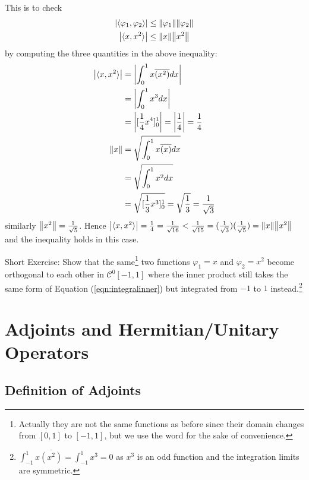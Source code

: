 \begin{solution}
This is to check 
\begin{align*}
\abs{\langle\varphi_1 , \varphi_2\rangle} &\leq \norm{\varphi_1}\norm{\varphi_2} \\
\abs{\langle x , x^2\rangle} &\leq \norm{x}\norm{x^2}
\end{align*}
by computing the three quantities in the above inequality:
\begin{align*}
\abs{\langle x , x^2\rangle} &= \abs{\int_0^1 x \overline{(x^2)} dx} \\
&= \abs{\int_0^1 x^3 dx} \\
&= \abs{[\frac{1}{4}x^4]_0^1} = \abs{\frac{1}{4}} = \frac{1}{4} \\
\norm{x} &= \sqrt{\int_0^1 x \overline{(x)} dx} \\
&= \sqrt{\int_0^1 x^2 dx} \\
&= \sqrt{[\frac{1}{3}x^3]_0^1} = \sqrt{\frac{1}{3}} =\frac{1}{\sqrt{3}}
\end{align*}
similarly $\norm{x^2} = \frac{1}{\sqrt{5}}$. Hence $\abs{\langle x , x^2\rangle} = \frac{1}{4} = \frac{1}{\sqrt{16}} < \frac{1}{\sqrt{15}} = (\frac{1}{\sqrt{3}})(\frac{1}{\sqrt{5}}) = \norm{x}\norm{x^2}$ and the inequality holds in this case.
\end{solution}
Short Exercise: Show that the same\footnote{Actually they are not the same functions as before since their domain changes from $[0,1]$ to $[-1,1]$, but we use the word for the sake of convenience.} two functions $\varphi_1 = x$ and $\varphi_2 = x^2$ become orthogonal to each other in $\mathcal{C}^0[-1,1]$ where the inner product still takes the same form of Equation (\ref{eqn:integralinner}) but integrated from $-1$ to $1$ instead.\footnote{$\int_{-1}^1 x \overline{(x^2)} = \int_{-1}^1 x^3 = 0$ as $x^3$ is an odd function and the integration limits are symmetric.}

\section{Adjoints and Hermitian/Unitary Operators}

\subsection{Definition of Adjoints}

